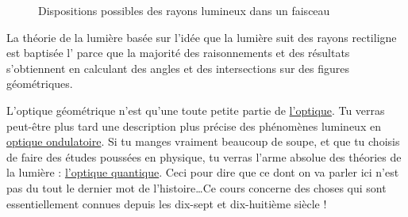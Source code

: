 \begin{figure}[ht]
\centering
{}						%

\caption{Dispositions possibles des rayons lumineux dans un faisceau}
\end{figure}
La théorie de la lumière basée sur l'idée que la lumière suit des rayons rectiligne est baptisée l'\href{http://fr.wikipedia.org/wiki/Optique_géométrique}{} parce que la majorité des raisonnements et des résultats s'obtiennent en calculant des angles et des intersections sur des figures géométriques. 

L'optique géométrique n'est qu'une toute petite partie de \href{http://fr.wikipedia.org/wiki/Optique}{l'optique}. Tu verras peut-être plus tard une description plus précise des phénomènes lumineux en \href{http://fr.wikipedia.org/wiki/Optique_ondulatoire}{optique ondulatoire}. Si tu manges vraiment beaucoup de soupe, et que tu choisis de faire des études poussées en physique, tu verras l'arme absolue des théories de la lumière : \href{http://fr.wikipedia.org/wiki/Optique_quantique}{l'optique quantique}. Ceci pour dire que ce dont on va parler ici n'est pas du tout le dernier mot de l'histoire\ldots Ce cours concerne des choses qui sont essentiellement connues depuis les dix-sept et dix-huitième siècle ! 


